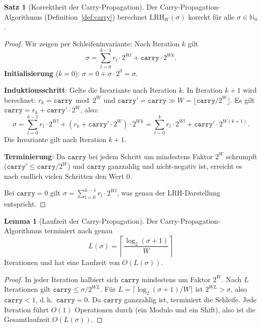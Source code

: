 ﻿\documentclass[a4paper,12pt]{article}
\theoremstyle{definition}
\newtheorem{satz}{Satz}
\newtheorem{lemma}{Lemma}
\begin{document}
\begin{satz}[Korrektheit der Carry-Propagation]
\label{satz:carry_korrekt}
Der Carry-Propagation-Algorithmus (Definition~\ref{def:carry}) berechnet
$\mathrm{LRH}_W(\sigma)$ korrekt für alle $\sigma \in \mathbb{N}_0$.
\end{satz}

\begin{proof}
Wir zeigen per Schleifeninvariante: Nach Iteration $k$ gilt
\[
  \sigma = \sum_{l=0}^{k-1} r_l \cdot 2^{Wl} + \mathtt{carry} \cdot 2^{Wk}.
\]
\textbf{Initialisierung} ($k=0$): $\sigma = 0 + \sigma \cdot 2^0 = \sigma$. \checkmark

\textbf{Induktionsschritt}: Gelte die Invariante nach Iteration $k$.
In Iteration $k+1$ wird berechnet:
$r_k = \mathtt{carry} \bmod 2^W$ und $\mathtt{carry}' = \mathtt{carry} \gg W
= \lfloor \mathtt{carry} / 2^W \rfloor$.
Es gilt $\mathtt{carry} = r_k + \mathtt{carry}' \cdot 2^W$, also:
\[
  \sigma = \sum_{l=0}^{k-1} r_l \cdot 2^{Wl} + (r_k + \mathtt{carry}' \cdot 2^W) \cdot 2^{Wk}
         = \sum_{l=0}^{k} r_l \cdot 2^{Wl} + \mathtt{carry}' \cdot 2^{W(k+1)}.
\]
Die Invariante gilt nach Iteration $k+1$. \checkmark

\textbf{Terminierung}: Da $\mathtt{carry}$ bei jedem Schritt um mindestens Faktor $2^W$
schrumpft ($\mathtt{carry}' \leq \mathtt{carry} / 2^W$) und $\mathtt{carry}$ ganzzahlig
und nicht-negativ ist, erreicht es nach endlich vielen Schritten den Wert $0$.

Bei $\mathtt{carry} = 0$ gilt $\sigma = \sum_{l=0}^{k-1} r_l \cdot 2^{Wl}$, was genau der
LRH-Darstellung entspricht.
\end{proof}

\begin{lemma}[Laufzeit der Carry-Propagation]
\label{lem:carry_laufzeit}
Der Carry-Propagation-Algorithmus terminiert nach genau
\[
  L(\sigma) = \left\lceil \frac{\log_2(\sigma+1)}{W} \right\rceil
\]
Iterationen und hat eine Laufzeit von $O(L(\sigma))$.
\end{lemma}

\begin{proof}
In jeder Iteration halbiert sich $\mathtt{carry}$ mindestens um Faktor $2^W$.
Nach $L$ Iterationen gilt $\mathtt{carry} \leq \sigma / 2^{WL}$.
Für $L = \lceil \log_2(\sigma+1) / W \rceil$ ist $2^{WL} > \sigma$, also
$\mathtt{carry} < 1$, d.\,h.\ $\mathtt{carry} = 0$. Da $\mathtt{carry}$ ganzzahlig ist,
terminiert die Schleife. Jede Iteration führt $O(1)$ Operationen durch
(ein Modulo und ein Shift), also ist die Gesamtlaufzeit $O(L(\sigma))$.
\end{proof}
\end{document}
